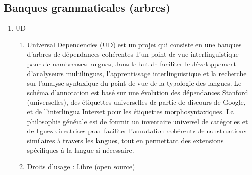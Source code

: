 \documentclass{book}
\begin{document}
\subsection{Banques grammaticales (arbres) }
\begin{enumerate}
	\item UD
        \begin{enumerate}
            \item Universal Dependencies (UD) est un projet qui consiste en  une banques d'arbres de dépendances cohérentes d'un point de vue interlinguistique pour de nombreuses langues, dans le but de faciliter le développement d'analyseurs multilingues, l'apprentissage interlinguistique et la recherche sur l'analyse syntaxique du point de vue de la typologie des langues. Le schéma d'annotation est basé sur une évolution des dépendances Stanford (universelles), des étiquettes universelles de partie de discours de Google, et de l'interlingua Interset pour les étiquettes morphosyntaxiques. La philosophie générale est de fournir un inventaire universel de catégories et de lignes directrices pour faciliter l'annotation cohérente de constructions similaires à travers les langues, tout en permettant des extensions spécifiques à la langue si nécessaire.
            \item Droits d'usage : Libre (open source)
        \end{enumerate}
\end{enumerate}
\end{document}
